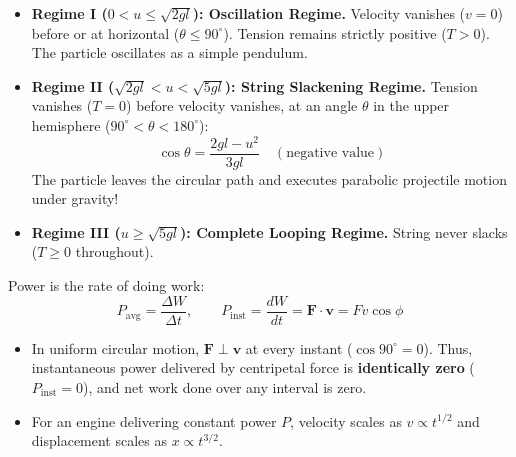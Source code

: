 \documentclass[10pt,twoside,openright]{book}
\begin{document}
\begin{usecasebox}
\begin{itemize}
  \item \textbf{Regime I ($0 < u \le \sqrt{2gl}$): Oscillation Regime.} Velocity vanishes ($v=0$) before or at horizontal ($\theta \le 90^\circ$). Tension remains strictly positive ($T > 0$). The particle oscillates as a simple pendulum.
  \item \textbf{Regime II ($\sqrt{2gl} < u < \sqrt{5gl}$): String Slackening Regime.} Tension vanishes ($T=0$) before velocity vanishes, at an angle $\theta$ in the upper hemisphere ($90^\circ < \theta < 180^\circ$):
  \begin{equation}
    \cos\theta = \frac{2gl - u^2}{3gl} \quad (\text{negative value})
  \end{equation}
  The particle leaves the circular path and executes parabolic projectile motion under gravity!
  \item \textbf{Regime III ($u \ge \sqrt{5gl}$): Complete Looping Regime.} String never slacks ($T \ge 0$ throughout).
\end{itemize}
\end{usecasebox}

\begin{trapbox}
Power is the rate of doing work:
\begin{equation}
  P_{\text{avg}} = \frac{\Delta W}{\Delta t}, \qquad P_{\text{inst}} = \frac{dW}{dt} = \mathbf{F} \cdot \mathbf{v} = F v \cos\phi
\end{equation}
\begin{itemize}
  \item In uniform circular motion, $\mathbf{F} \perp \mathbf{v}$ at every instant ($\cos 90^\circ = 0$). Thus, instantaneous power delivered by centripetal force is \textbf{identically zero} ($P_{\text{inst}} = 0$), and net work done over any interval is zero.
  \item For an engine delivering constant power $P$, velocity scales as $v \propto t^{1/2}$ and displacement scales as $x \propto t^{3/2}$.
\end{itemize}
\end{trapbox}

\end{document}
